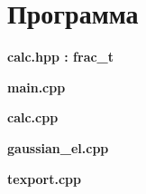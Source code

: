 \documentclass[a4paper,14pt]{report}
\begin{document}
\section*{Программа}%

\textbf{calc.hpp : frac\_t}


\textbf{main.cpp}

\clearpage

\textbf{calc.cpp}

\clearpage

\textbf{gaussian\_el.cpp}

\clearpage

\textbf{texport.cpp}

\clearpage




\nocite{rh}
\end{document}
